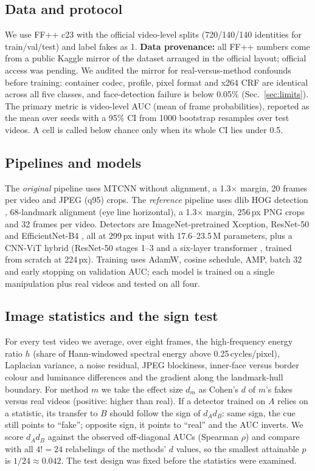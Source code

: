 \documentclass[conference]{IEEEtran}
\begin{document}
\subsection{Data and protocol}
We use FF++ c23 with the official video-level splits (720/140/140 identities
for train/val/test) and label fakes as 1. \textbf{Data provenance:} all FF++
numbers come from a public Kaggle mirror of the dataset arranged in the
official layout; official access was pending. We audited the mirror for
real-versus-method confounds before training: container codec, profile, pixel
format and x264 CRF are identical across all five classes, and face-detection
failure is below 0.05\% (Sec.~\ref{sec:limits}). The primary metric is
video-level AUC (mean of frame probabilities), reported as the mean over seeds
with a 95\% CI from 1000 bootstrap resamples over test videos. A cell is
called below chance only when its whole CI lies under 0.5.

\subsection{Pipelines and models}
The \emph{original} pipeline uses MTCNN \cite{zhang2016mtcnn} without
alignment, a 1.3$\times$ margin, 20 frames per video and JPEG (q95) crops. The
\emph{reference} pipeline uses dlib HOG detection \cite{king2009dlib},
68-landmark alignment \cite{kazemi2014landmarks} (eye line horizontal), a
1.3$\times$ margin, 256\,px PNG crops and 32 frames per video. Detectors are
ImageNet-pretrained Xception, ResNet-50 \cite{he2016resnet} and
EfficientNet-B4 \cite{tan2019efficientnet}, all at 299\,px input with
17.6--23.5\,M parameters, plus a CNN-ViT hybrid (ResNet-50 stages 1--3 and a
six-layer transformer \cite{dosovitskiy2021vit}, trained from scratch at
224\,px). Training uses AdamW, cosine schedule, AMP, batch 32 and early
stopping on validation AUC; each model is trained on a single manipulation
plus real videos and tested on all four.

\subsection{Image statistics and the sign test}
For every test video we average, over eight frames, the high-frequency energy
ratio $h$ (share of Hann-windowed spectral energy above 0.25\,cycles/pixel),
Laplacian variance, a noise residual, JPEG blockiness, inner-face versus
border colour and luminance differences and the gradient along the
landmark-hull boundary. For method $m$ we take the effect size $d_m$ as
Cohen's $d$ of $m$'s fakes versus real videos (positive: higher than real).
If a detector trained on $A$ relies on a statistic, its transfer to $B$ should
follow the sign of $d_A d_B$: same sign, the cue still points to ``fake'';
opposite sign, it points to ``real'' and the AUC inverts. We score
$d_A d_B$ against the observed off-diagonal AUCs (Spearman $\rho$) and
compare with all $4!=24$ relabelings of the methods' $d$ values, so the
smallest attainable $p$ is $1/24\approx0.042$. The test design was fixed
before the statistics were examined.
\end{document}

